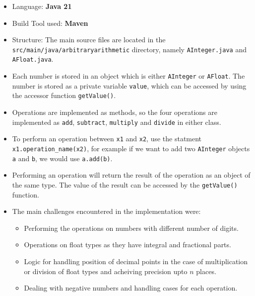 \documentclass[15pt]{article}
\begin{document}
\begin{itemize}
    \item Language: \textbf{Java 21}
    
    \item Build Tool used: \textbf{Maven}
    
    \item Structure: The main source files are located in the \texttt{src/main/java/arbitraryarithmetic}
    directory, namely \texttt{AInteger.java} and \texttt{AFloat.java}.

    \item Each number is stored in an object which is either \texttt{AInteger} or 
    \texttt{AFloat}. The number is stored as a private variable \texttt{value}, which
    can be accessed by using the accessor function \texttt{getValue()}.

    \item Operations are implemented as methods, so the four operations are implemented as 
    \texttt{add}, \texttt{subtract}, \texttt{multiply} and \texttt{divide} in either class.

    \item To perform an operation between \texttt{x1} and \texttt{x2}, use the statment 
    \texttt{x1.operation\_name(x2)}, for example if we want to add two \texttt{AInteger} objects \texttt{a} and \texttt{b}, 
    we would use \texttt{a.add(b)}.

    \item Performing an operation will return the result of the operation as an object 
    of the same type. The value of the result can be accessed by the \texttt{getValue()} function.

    \item The main challenges encountered in the implementation were:
    
    \begin{itemize}
        \item Performing the operations on numbers with different number of digits.
        \item Operations on float types as they have integral and fractional parts.
        \item Logic for handling position of decimal points in the case of multiplication or division of float types and acheiving precision upto $n$ places.
        \item Dealing with negative numbers and handling cases for each operation.
    
    \end{itemize}
\end{itemize}
\end{document}
